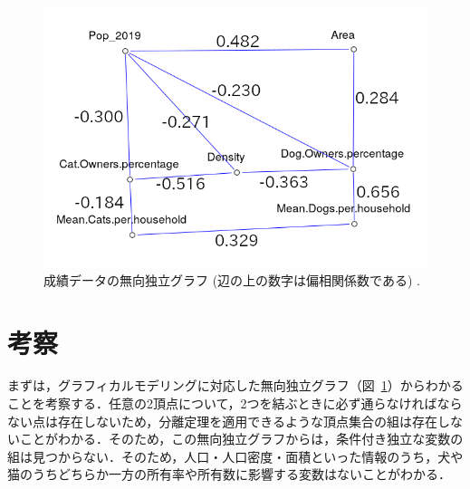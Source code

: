 \documentclass[11pt,dvipdfmx]{jarticle}
\theoremstyle{definition}
\begin{document}
\begin{figure}[htbp]
    \begin{center}
        \includegraphics[width=\linewidth]{graph_num}
        \caption{成績データの無向独立グラフ (辺の上の数字は偏相関係数である) .}
        \label{fig:graph-final}
    \end{center}
\end{figure}
\clearpage



\section{考察}
まずは，グラフィカルモデリングに対応した無向独立グラフ（図~\ref{fig:graph-final}）からわかることを考察する．任意の2頂点について，2つを結ぶときに必ず通らなければならない点は存在しないため，分離定理を適用できるような頂点集合の組は存在しないことがわかる．そのため，この無向独立グラフからは，条件付き独立な変数の組は見つからない．そのため，人口・人口密度・面積といった情報のうち，犬や猫のうちどちらか一方の所有率や所有数に影響する変数はないことがわかる．
\end{document}
